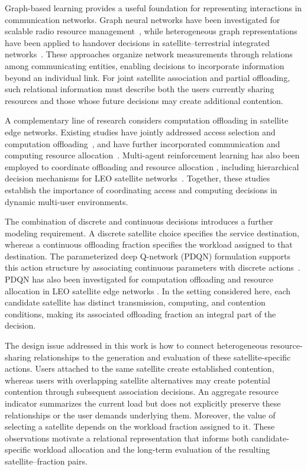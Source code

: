 \documentclass[journal]{IEEEtran}
\begin{document}
Graph-based learning provides a useful foundation for
representing interactions in communication networks.
Graph neural networks have been investigated for scalable
radio resource management~\cite{shen2021graph}, while
heterogeneous graph representations have been applied to
handover decisions in satellite--terrestrial integrated
networks~\cite{fu2026heterographhandover}.
These approaches organize network measurements through
relations among communicating entities, enabling decisions
to incorporate information beyond an individual link.
For joint satellite association and partial offloading,
such relational information must describe both the users
currently sharing resources and those whose future decisions
may create additional contention.

A complementary line of research considers computation
offloading in satellite edge networks.
Existing studies have jointly addressed access selection
and computation offloading~\cite{yang2025access}, and have
further incorporated communication and computing resource
allocation~\cite{yang2025accessresource}.
Multi-agent reinforcement learning has also been employed
to coordinate offloading and resource allocation
\cite{li2024marl_offloading,hassan2024comappo},
including hierarchical decision mechanisms for LEO
satellite networks~\cite{lai2025hierarchical}.
Together, these studies establish the importance of
coordinating access and computing decisions in dynamic
multi-user environments.

The combination of discrete and continuous decisions
introduces a further modeling requirement.
A discrete satellite choice specifies the service
destination, whereas a continuous offloading fraction
specifies the workload assigned to that destination.
The parameterized deep Q-network (PDQN) formulation
supports this action structure by associating continuous
parameters with discrete actions~\cite{xiong2018pdqn}.
PDQN has also been investigated for computation offloading
and resource allocation in LEO satellite edge networks
\cite{yang2023leopdqn}.
In the setting considered here, each candidate satellite
has distinct transmission, computing, and contention
conditions, making its associated offloading fraction
an integral part of the decision.

The design issue addressed in this work is how to connect
heterogeneous resource-sharing relationships to the
generation and evaluation of these satellite-specific
actions.
Users attached to the same satellite create established
contention, whereas users with overlapping satellite
alternatives may create potential contention through
subsequent association decisions.
An aggregate resource indicator summarizes the current
load but does not explicitly preserve these relationships
or the user demands underlying them.
Moreover, the value of selecting a satellite depends on
the workload fraction assigned to it.
These observations motivate a relational representation
that informs both candidate-specific workload allocation
and the long-term evaluation of the resulting
satellite--fraction pairs.
\end{document}
